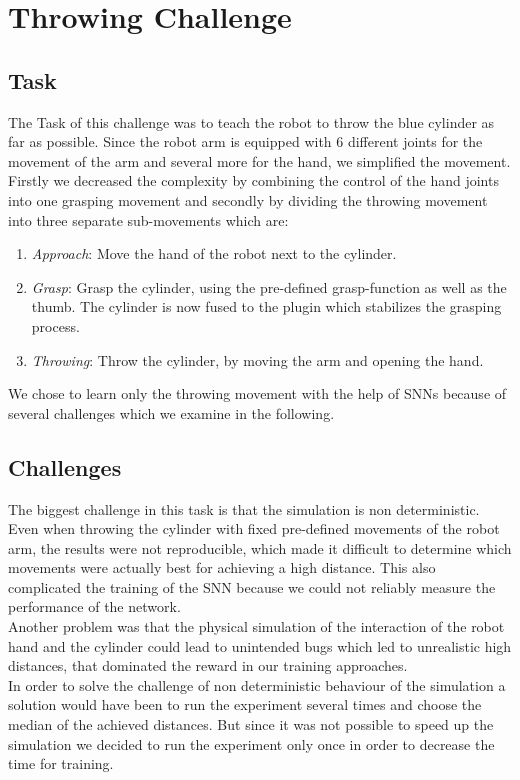 \section{Throwing Challenge}
\subsection{Task}
The Task of this challenge was to teach the robot to throw the blue cylinder as far as possible. Since the robot arm is equipped with 6 different joints for the movement of the arm and several more for the hand, we simplified the movement. Firstly we decreased the complexity by combining the control of the hand joints into one grasping movement and secondly by dividing the throwing movement into three separate sub-movements which are: 
 \begin{enumerate}
\item \textit{Approach}: Move the hand of the robot next to the cylinder.
\item \textit{Grasp}: Grasp the cylinder, using the pre-defined grasp-function as well as the thumb. The cylinder is now fused to the plugin which stabilizes the grasping process.
\item \textit{Throwing}: Throw the cylinder, by moving the arm and opening the hand. 
\end{enumerate}
We chose to learn only the throwing movement with the help of SNNs because of several challenges which we examine in the following.

\subsection{Challenges}
\label{sec:challenges}
The biggest challenge in this task is that the simulation is non deterministic. Even when throwing the cylinder with fixed pre-defined movements of the robot arm, the results were not reproducible, which made it difficult to determine which movements were actually best for achieving a high distance. This also complicated the training of the SNN because we could not reliably measure the performance of the network.\\
Another problem was that the physical simulation of the interaction of the robot hand and the cylinder could lead to unintended bugs which led to unrealistic high distances, that dominated the reward in our training approaches.\\
In order to solve the challenge of non deterministic behaviour of the simulation a solution would have been to run the experiment several times and choose the median of the achieved distances. But since it was not possible to speed up the simulation we decided to run the experiment only once in order to decrease the time for training.\\




